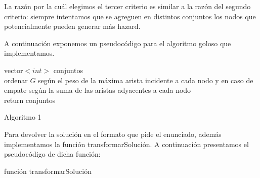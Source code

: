 \documentclass[11pt, a4paper, twoside]{article}
\begin{document}
\begin{enumerate}
\begin{enumerate}
			La razón por la cuál elegimos el tercer criterio es similar a la razón del segundo criterio: siempre intentamos que
			se agreguen en distintos conjuntos los nodos que potencialmente pueden generar más hazard.
			
			
		\end{enumerate}
		
		A continuación exponemos un pseudocódigo para el algoritmo goloso que implementamos. \\
		\begin{algorithm}[H]
		  vector$<int>$ conjuntos \\
		  ordenar $G$ según el peso de la máxima arista incidente a cada nodo y en caso de empate según la suma
		  de las aristas adyacentes a cada nodo \\
		  return conjuntos
		\caption{Algoritmo 1}
		\end{algorithm}
		
		Para devolver la solución en el formato que pide el enunciado, además implementamos la función transformarSolución.
		A continuación presentamos el pseudocódigo de dicha función:
		\begin{algorithm}[H]
		\caption{función transformarSolución}
		\end{algorithm}
		

\end{enumerate}
\end{document}
